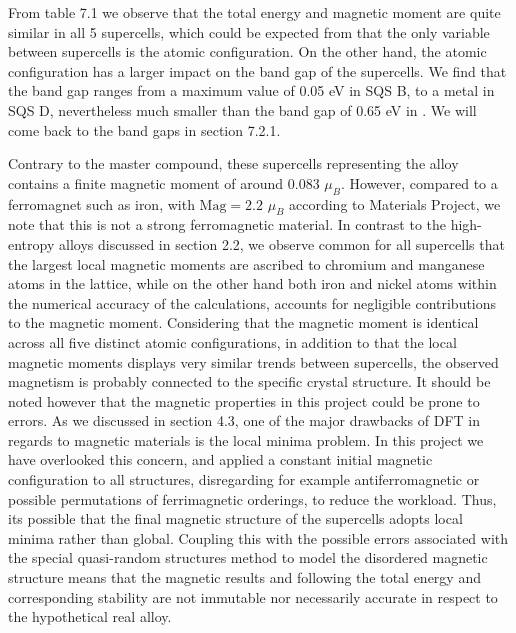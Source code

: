 From table 7.1 we observe that the total energy and magnetic moment are quite similar in all 5 supercells, which could be expected from that the only variable between supercells is the atomic configuration. On the other hand, the atomic configuration has a larger impact on the band gap of the supercells. We find that the band gap ranges from a maximum value of 0.05 eV in SQS B, to a metal in SQS D, nevertheless much smaller than the band gap of 0.65 eV in . We will come back to the band gaps in section 7.2.1. 

Contrary to the master compound, these supercells representing the  alloy contains a finite magnetic moment of around $0.083$  $\mu_B$. However, compared to a ferromagnet such as iron, with $\text{Mag} = 2.2$  $\mu_B$ according to Materials Project, we note that this is not a strong ferromagnetic material. In contrast to the high-entropy alloys discussed in section 2.2, we observe common for all supercells that the largest local magnetic moments are ascribed to chromium and manganese atoms in the lattice, while on the other hand both iron and nickel atoms within the numerical accuracy of the calculations, accounts for negligible contributions to the magnetic moment. Considering that the magnetic moment is identical across all five distinct atomic configurations, in addition to that the local magnetic moments displays very similar trends between supercells, the observed magnetism is probably connected to the specific crystal structure. It should be noted however that the magnetic properties in this project could be prone to errors. As we discussed in section 4.3, one of the major drawbacks of DFT in regards to magnetic materials is the local minima problem. In this project we have overlooked this concern, and applied a constant initial magnetic configuration to all structures, disregarding for example antiferromagnetic or possible permutations of ferrimagnetic orderings, to reduce the workload. Thus, its possible that the final magnetic structure of the supercells adopts local minima rather than global. Coupling this with the possible errors associated with the special quasi-random structures method to model the disordered magnetic structure means that the magnetic results and following the total energy and corresponding stability are not immutable nor necessarily accurate in respect to the hypothetical real alloy. 
    
